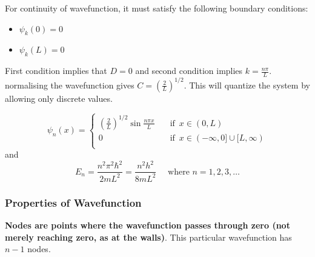 \documentclass[11pt]{article}
\theoremstyle{definition}
\begin{document}
For continuity of wavefunction, it must satisfy the following boundary conditions:
\begin{itemize}
    \item $\psi_k (0) = 0$
    \item $\psi_k (L) = 0$
\end{itemize}

First condition implies that $D=0$ and second condition implies $k = \frac{n\pi}{L}$. normalising the wavefunction gives $C = \left(\frac{2}{L}\right)^{1/2}$. This will quantize the system by allowing only discrete values.
\begin{shaded}
\begin{equation*}
\psi_n(x) =\begin{cases}
          \left(\frac{2}{L}\right)^{1/2}\sin{\frac{n\pi x}{L}} \quad &\text{if } \, x \in (0,L) \\
          0 \quad &\text{if } \, x \in (-\infty,0] \cup [L, \infty) \\
     \end{cases}
\end{equation*}
and 
\begin{equation*}
    E_n = \frac{n^2 \pi^2 \hbar^2}{2mL^2} = \frac{n^2 h^2}{8mL^2} \quad  \text{ where }n=1,2,3,\dots
\end{equation*}
\end{shaded}
\subsubsection{Properties of Wavefunction}
\textbf{Nodes are points where the wavefunction passes through zero (not merely reaching zero, as at the walls)}. This particular wavefunction has $n-1$ nodes.

\end{document}
